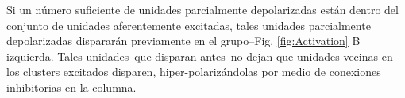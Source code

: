 Si un número suficiente de unidades parcialmente depolarizadas están dentro del conjunto de unidades aferentemente excitadas, tales unidades parcialmente depolarizadas dispararán previamente en el grupo--Fig. \ref{fig:Activation} B izquierda. Tales unidades--que disparan antes--no dejan que unidades vecinas en los clusters excitados disparen, hiper-polarizándolas por medio de conexiones inhibitorias en la columna.


